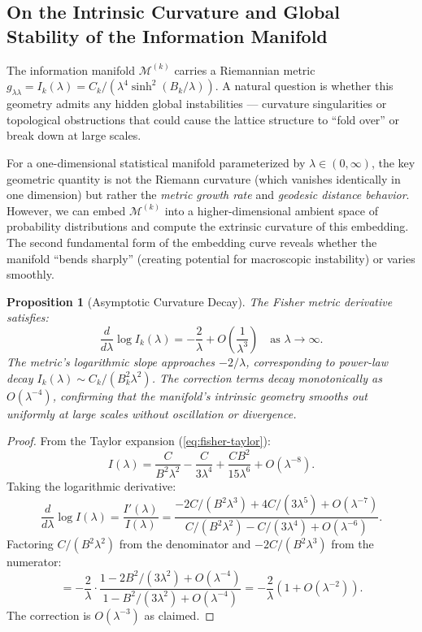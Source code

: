 \documentclass[11pt]{article}
\newtheorem{proposition}[theorem]{Proposition}
\theoremstyle{remark}
\begin{document}
\subsection{On the Intrinsic Curvature and Global Stability of the Information Manifold}

The information manifold $\mathcal{M}^{(k)}$ carries a Riemannian metric
$g_{\lambda\lambda} = I_k(\lambda) = C_k/(\lambda^4 \sinh^2(B_k/\lambda))$.
A natural question is whether this geometry admits any hidden global
instabilities --- curvature singularities or topological obstructions
that could cause the lattice structure to ``fold over'' or break down
at large scales.

For a one-dimensional statistical manifold parameterized by $\lambda \in
(0, \infty)$, the key geometric quantity is not the Riemann curvature
(which vanishes identically in one dimension) but rather the \emph{metric
growth rate} and \emph{geodesic distance behavior}. However, we can
embed $\mathcal{M}^{(k)}$ into a higher-dimensional ambient space of
probability distributions and compute the extrinsic curvature of this
embedding. The second fundamental form of the embedding curve reveals
whether the manifold ``bends sharply'' (creating potential for
macroscopic instability) or varies smoothly.

\begin{proposition}[Asymptotic Curvature Decay]
\label{prop:curvature-decay}
The Fisher metric derivative satisfies:
\begin{equation}
\frac{d}{d\lambda} \log I_k(\lambda) = -\frac{2}{\lambda} +
O\!\left(\frac{1}{\lambda^3}\right)
\quad \text{as } \lambda \to \infty.
\end{equation}
The metric's logarithmic slope approaches $-2/\lambda$, corresponding
to power-law decay $I_k(\lambda) \sim C_k/(B_k^2 \lambda^2)$. The
correction terms decay monotonically as $O(\lambda^{-4})$, confirming
that the manifold's intrinsic geometry smooths out uniformly at large
scales without oscillation or divergence.
\end{proposition}

\begin{proof}
From the Taylor expansion (\ref{eq:fisher-taylor}):
\begin{equation}
I(\lambda) = \frac{C}{B^2 \lambda^2} - \frac{C}{3\lambda^4}
+ \frac{CB^2}{15\lambda^6} + O(\lambda^{-8}).
\end{equation}
Taking the logarithmic derivative:
\begin{equation}
\frac{d}{d\lambda} \log I(\lambda) = \frac{I'(\lambda)}{I(\lambda)}
= \frac{-2C/(B^2\lambda^3) + 4C/(3\lambda^5) + O(\lambda^{-7})}{C/(B^2\lambda^2) - C/(3\lambda^4) + O(\lambda^{-6})}.
\end{equation}
Factoring $C/(B^2\lambda^2)$ from the denominator and $-2C/(B^2\lambda^3)$
from the numerator:
\begin{equation}
= -\frac{2}{\lambda} \cdot
\frac{1 - 2B^2/(3\lambda^2) + O(\lambda^{-4})}{1 - B^2/(3\lambda^2) + O(\lambda^{-4})}
= -\frac{2}{\lambda} \left(1 + O(\lambda^{-2})\right).
\end{equation}
The correction is $O(\lambda^{-3})$ as claimed. \qedhere
\end{proof}
\end{document}
